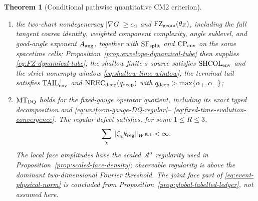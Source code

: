 \documentclass[11pt]{article}
\newtheorem{theorem}{Theorem}[section]
\begin{document}
\begin{theorem}[Conditional pathwise quantitative CM2 criterion]
\begin{enumerate}[label=\textup{(H\arabic*)}]
      \eqref{eq:global-finite-marked-envelope}, the exhaustive owner identity
      \eqref{eq:exhaustive-source-owner-partition}, and the main-source base
      bounds \eqref{eq:main-source-base-mass} uniformly on the same parent
      cells.  The joint source likelihood is verified either by the
      same-carrier clause of Lemma~\ref{lem:joint-source-factor-criterion} or
      by its explicit $\mathrm{CARRIER\_MATCH}$ alternative.
      Here \(\mathrm{KRH}_{p_W}\) is uniform on every frozen parent kernel.
      These interfaces and the dominant chart bounds
      \eqref{eq:primitive-dominant-chart-bounds} have the
      parameter-uniform constants required by $\mathrm{UCR}_{\rm sh}$ for
      $C_{\rm mid}(\eta_{\rm hi})N\le L(s)$.  The cutoffs
      \eqref{eq:three-frequency-cutoffs} satisfy
      $0<\eta_{\rm lo}<\eta_{\rm hi}$ and
      $r_{\rm obs}>2+\beta_{\rm phase}^{W}$,
      \eqref{eq:ultra-high-exponent-window}, and the complete phase exponent
      \eqref{eq:complete-phase-exponent}; longer shallow times are not estimated
      by this interface;
\item the two-chart nondegeneracy $|\nabla G|\ge c_G$ and
      $\mathrm{FZ}_{\rm geom}(\theta_Z)$, including the full tangent coarea identity,
      weighted component complexity, angle sublevel, and good-angle exponent
      $A_{\rm ang}$, together with $\mathrm{SF}_{\rm split}$ and
      $\mathrm{CP}_{\rm env}$ on the same spacetime cells;
      Proposition~\ref{prop:envelope-dynamical-tube}
      then supplies \eqref{eq:FZ-dynamical-tube}; the shallow finite-$s$
      source satisfies $\mathrm{SHCOL}_{\rm env}$ and the strict nonempty
      window \eqref{eq:shallow-time-window}; the terminal tail satisfies
      $\mathrm{TAIL}_{\rm env}^{+}$ and
      $\mathrm{NREC}_{\rm deep}(q_{\rm deep})$ with
      $q_{\rm deep}>\max\{\alpha_+,\alpha_-\}$;
\item $\mathrm{MT}_{\rm DQ}$ holds for the fixed-gauge operator quotient,
      including its exact typed decomposition and
      \eqref{eq:uniform-gauge-DQ-regular}--
      \eqref{eq:fixed-time-evolution-convergence}.  The regular defect
      satisfies, for some
      $1\le R\le3$,
      \[
       \sum_\chi\|\zeta_\chi k_{\rm reg}\|_{W^{R,1}}<\infty.
      \]
      The local face amplitudes have the scaled
      $\mathcal A^\alpha$ regularity used in
      Proposition~\ref{prop:scaled-face-density}; observable regularity is
      above the dominant two-dimensional Fourier threshold.  The joint face
      part of \eqref{eq:event-physical-norm} is concluded from
      Proposition~\ref{prop:global-labelled-ledger}, not assumed here.

\end{enumerate}
\end{theorem}
\end{document}
